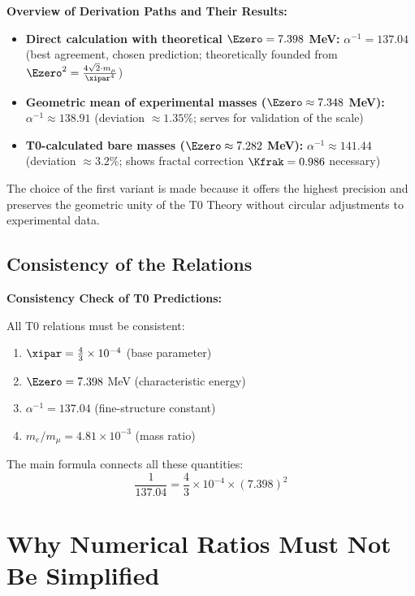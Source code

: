 	\begin{foundation}
		\textbf{Overview of Derivation Paths and Their Results:}
		\begin{itemize}
			\item \textbf{Direct calculation with theoretical $\Ezero = 7.398$ MeV:} $\alpha^{-1} = 137.04$ (best agreement, chosen prediction; theoretically founded from $\Ezero^2 = \frac{4\sqrt{2} \cdot m_\mu}{\xipar^4}$)
			\item \textbf{Geometric mean of experimental masses ($\Ezero \approx 7.348$ MeV):} $\alpha^{-1} \approx 138.91$ (deviation $\approx 1.35\%$; serves for validation of the scale)
			\item \textbf{T0-calculated bare masses ($\Ezero \approx 7.282$ MeV):} $\alpha^{-1} \approx 141.44$ (deviation $\approx 3.2\%$; shows fractal correction $\Kfrak = 0.986$ necessary)
		\end{itemize}
		
		The choice of the first variant is made because it offers the highest precision and preserves the geometric unity of the T0 Theory without circular adjustments to experimental data.
	\end{foundation}	

	\subsection{Consistency of the Relations}
	
	\begin{keyresult}
		\textbf{Consistency Check of T0 Predictions:}
		
		All T0 relations must be consistent:
		\begin{enumerate}
			\item $\xipar = \frac{4}{3} \times 10^{-4}$ (base parameter)
			\item $\Ezero = 7.398$ MeV (characteristic energy)
			\item $\alpha^{-1} = 137.04$ (fine-structure constant)
			\item $m_e/m_\mu = 4.81 \times 10^{-3}$ (mass ratio)
		\end{enumerate}
		
		The main formula connects all these quantities:
		\begin{equation}
			\frac{1}{137.04} = \frac{4}{3} \times 10^{-4} \times (7.398)^2
		\end{equation}
	\end{keyresult}

	\section{Why Numerical Ratios Must Not Be Simplified}
	
